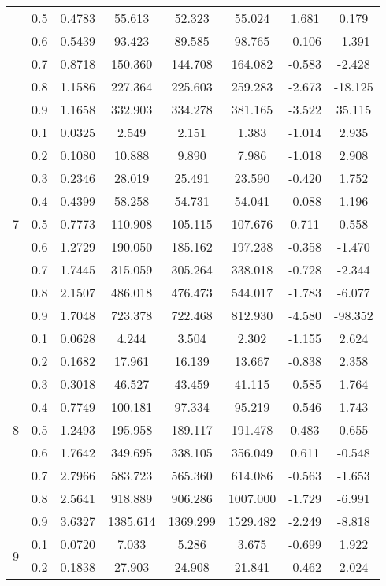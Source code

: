 \documentclass[11pt,a4paper]{report}
\begin{document}
\begin{longtable}{ | c | c || c | c | c | c | c | c | }
 & 0.5 & 0.4783 & 55.613 & 52.323 & 55.024 & 1.681 & 0.179 \\
 & 0.6 & 0.5439 & 93.423 & 89.585 & 98.765 & -0.106 & -1.391 \\
 & 0.7 & 0.8718 & 150.360 & 144.708 & 164.082 & -0.583 & -2.428 \\
 & 0.8 & 1.1586 & 227.364 & 225.603 & 259.283 & -2.673 & -18.125 \\
 & 0.9 & 1.1658 & 332.903 & 334.278 & 381.165 & -3.522 & 35.115 \\
 \hline
\multirow{9}{*}{7} & 0.1 & 0.0325 & 2.549 & 2.151 & 1.383 & -1.014 & 2.935 \\
 & 0.2 & 0.1080 & 10.888 & 9.890 & 7.986 & -1.018 & 2.908 \\
 & 0.3 & 0.2346 & 28.019 & 25.491 & 23.590 & -0.420 & 1.752 \\
 & 0.4 & 0.4399 & 58.258 & 54.731 & 54.041 & -0.088 & 1.196 \\
 & 0.5 & 0.7773 & 110.908 & 105.115 & 107.676 & 0.711 & 0.558 \\
 & 0.6 & 1.2729 & 190.050 & 185.162 & 197.238 & -0.358 & -1.470 \\
 & 0.7 & 1.7445 & 315.059 & 305.264 & 338.018 & -0.728 & -2.344 \\
 & 0.8 & 2.1507 & 486.018 & 476.473 & 544.017 & -1.783 & -6.077 \\
 & 0.9 & 1.7048 & 723.378 & 722.468 & 812.930 & -4.580 & -98.352 \\
 \hline
\multirow{9}{*}{8} & 0.1 & 0.0628 & 4.244 & 3.504 & 2.302 & -1.155 & 2.624 \\
 & 0.2 & 0.1682 & 17.961 & 16.139 & 13.667 & -0.838 & 2.358 \\
 & 0.3 & 0.3018 & 46.527 & 43.459 & 41.115 & -0.585 & 1.764 \\
 & 0.4 & 0.7749 & 100.181 & 97.334 & 95.219 & -0.546 & 1.743 \\
 & 0.5 & 1.2493 & 195.958 & 189.117 & 191.478 & 0.483 & 0.655 \\
 & 0.6 & 1.7642 & 349.695 & 338.105 & 356.049 & 0.611 & -0.548 \\
 & 0.7 & 2.7966 & 583.723 & 565.360 & 614.086 & -0.563 & -1.653 \\
 & 0.8 & 2.5641 & 918.889 & 906.286 & 1007.000 & -1.729 & -6.991 \\
 & 0.9 & 3.6327 & 1385.614 & 1369.299 & 1529.482 & -2.249 & -8.818 \\
 \hline
\multirow{9}{*}{9} & 0.1 & 0.0720 & 7.033 & 5.286 & 3.675 & -0.699 & 1.922 \\
 & 0.2 & 0.1838 & 27.903 & 24.908 & 21.841 & -0.462 & 2.024 \\

\end{longtable}
\end{document}
